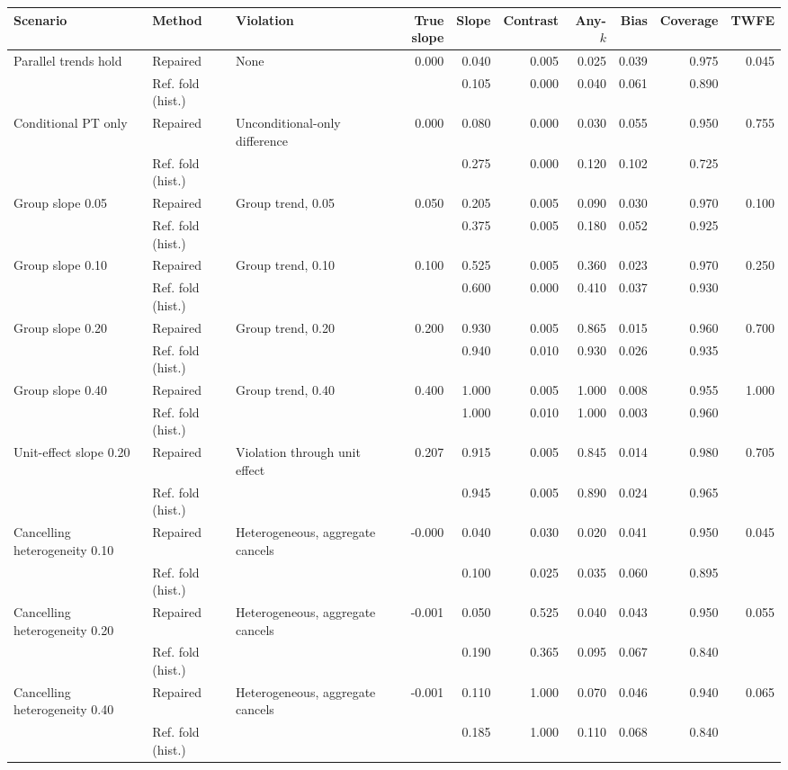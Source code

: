 \begin{tabular}{lllr rrr r r r}
\toprule
Scenario & Method & Violation & True slope & Slope & Contrast & Any-$k$ & Bias & Coverage & TWFE \\
\midrule
Parallel trends hold & Repaired & None & 0.000 & 0.040 & 0.005 & 0.025 & 0.039 & 0.975 & 0.045 \\
 & Ref. fold (hist.) &  &  & 0.105 & 0.000 & 0.040 & 0.061 & 0.890 &  \\
\addlinespace[2pt]
Conditional PT only & Repaired & Unconditional-only difference & 0.000 & 0.080 & 0.000 & 0.030 & 0.055 & 0.950 & 0.755 \\
 & Ref. fold (hist.) &  &  & 0.275 & 0.000 & 0.120 & 0.102 & 0.725 &  \\
\addlinespace[2pt]
Group slope 0.05 & Repaired & Group trend, 0.05 & 0.050 & 0.205 & 0.005 & 0.090 & 0.030 & 0.970 & 0.100 \\
 & Ref. fold (hist.) &  &  & 0.375 & 0.005 & 0.180 & 0.052 & 0.925 &  \\
\addlinespace[2pt]
Group slope 0.10 & Repaired & Group trend, 0.10 & 0.100 & 0.525 & 0.005 & 0.360 & 0.023 & 0.970 & 0.250 \\
 & Ref. fold (hist.) &  &  & 0.600 & 0.000 & 0.410 & 0.037 & 0.930 &  \\
\addlinespace[2pt]
Group slope 0.20 & Repaired & Group trend, 0.20 & 0.200 & 0.930 & 0.005 & 0.865 & 0.015 & 0.960 & 0.700 \\
 & Ref. fold (hist.) &  &  & 0.940 & 0.010 & 0.930 & 0.026 & 0.935 &  \\
\addlinespace[2pt]
Group slope 0.40 & Repaired & Group trend, 0.40 & 0.400 & 1.000 & 0.005 & 1.000 & 0.008 & 0.955 & 1.000 \\
 & Ref. fold (hist.) &  &  & 1.000 & 0.010 & 1.000 & 0.003 & 0.960 &  \\
\addlinespace[2pt]
Unit-effect slope 0.20 & Repaired & Violation through unit effect & 0.207 & 0.915 & 0.005 & 0.845 & 0.014 & 0.980 & 0.705 \\
 & Ref. fold (hist.) &  &  & 0.945 & 0.005 & 0.890 & 0.024 & 0.965 &  \\
\addlinespace[2pt]
Cancelling heterogeneity 0.10 & Repaired & Heterogeneous, aggregate cancels & -0.000 & 0.040 & 0.030 & 0.020 & 0.041 & 0.950 & 0.045 \\
 & Ref. fold (hist.) &  &  & 0.100 & 0.025 & 0.035 & 0.060 & 0.895 &  \\
\addlinespace[2pt]
Cancelling heterogeneity 0.20 & Repaired & Heterogeneous, aggregate cancels & -0.001 & 0.050 & 0.525 & 0.040 & 0.043 & 0.950 & 0.055 \\
 & Ref. fold (hist.) &  &  & 0.190 & 0.365 & 0.095 & 0.067 & 0.840 &  \\
\addlinespace[2pt]
Cancelling heterogeneity 0.40 & Repaired & Heterogeneous, aggregate cancels & -0.001 & 0.110 & 1.000 & 0.070 & 0.046 & 0.940 & 0.065 \\
 & Ref. fold (hist.) &  &  & 0.185 & 1.000 & 0.110 & 0.068 & 0.840 &  \\
\bottomrule
\end{tabular}
